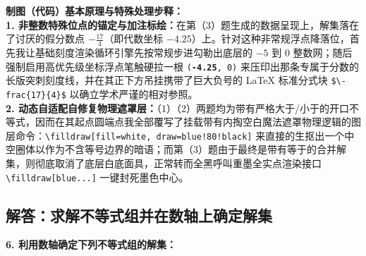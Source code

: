 \vspace{0.6cm}

{\small\color{blue!70!black}
\textbf{制图（代码）基本原理与特殊处理步释：}\\
\textbf{1. 非整数特殊位点的锚定与加注标绘：}在第（3）题生成的数据呈现上，解集落在了讨厌的假分数点 $-\frac{17}{4}$（即代数坐标 $-4.25$）上。针对这种非常规浮点降落位，首先我让基础刻度渲染循环引擎先按常规步进勾勒出底层的 $-5$ 到 $0$ 整数网；随后强制启用高优先级坐标浮点笔触硬拉一根 \texttt{(\textbf{-4.25}, 0)} 来压印出那条专属于分数的长版突刺刻度线，并在其正下方吊挂携带了巨大负号的 LaTeX 标准分式块 \texttt{\$\textbackslash -frac\{17\}\{4\}\$} 以确立学术严谨的相对参照。\\
\textbf{2. 动态自适配自修复物理遮罩层：}（1）（2）两题均为带有严格大于/小于的开口不等式，因而在其起点圆端点我全部覆写了挂载带有内掏空白魔法遮罩物理逻辑的图层命令：\texttt{\textbackslash filldraw[fill=white, draw=blue!80!black]} 来直接的生抠出一个中空圈体以作为不含等号边界的暗语；而第（3）题由于最终是带有等于的合并解集，则彻底取消了底层白底面具，正常转而全黑呼叫重墨全实点渲染接口 \texttt{\textbackslash filldraw[blue...]} 一键封死墨色中心。
}

\newpage

\newpage

\subsection{解答：求解不等式组并在数轴上确定解集}

\vspace{0.6cm}

\textbf{6. 利用数轴确定下列不等式组的解集：}

\vspace{0.4cm}

